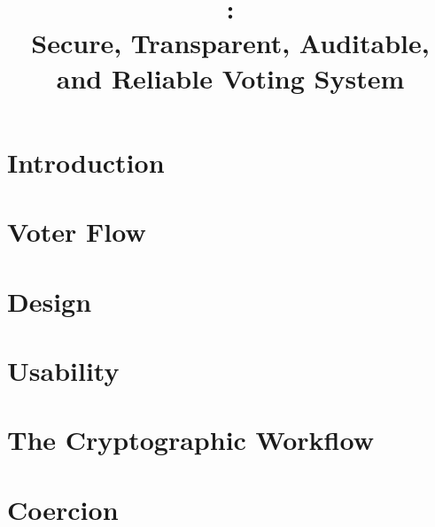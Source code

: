 \documentclass[letterpaper, 10pt, twocolumn]{article}
\title{\projname: \\
Secure, Transparent, Auditable, and Reliable Voting System}
\begin{document}
\maketitle

\begin{abstract}

\end{abstract}

\section{Introduction}


\section{Voter Flow}


\section{Design}


\section{Usability}


\section{The Cryptographic Workflow}


\section{Coercion}




\end{document}
